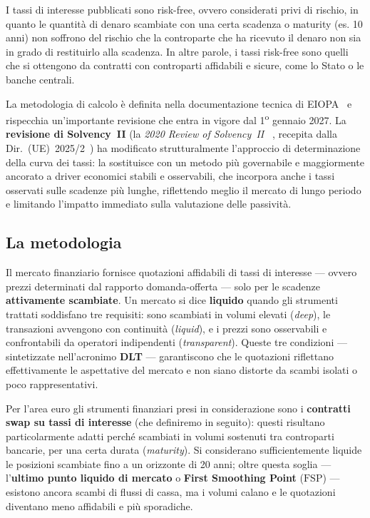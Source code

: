 \documentclass[11pt,a4paper]{article}
\theoremstyle{plain}
\theoremstyle{definition}
\theoremstyle{remark}
\newcommand{\FSP}{\mathrm{FSP}}
\begin{document}
I tassi di interesse pubblicati sono risk-free, ovvero considerati privi di rischio, in quanto le quantità di denaro scambiate con una certa scadenza o maturity (es. 10 anni)
non soffrono del rischio che la controparte che ha ricevuto il denaro non sia in grado di restituirlo alla scadenza. In altre parole, i tassi risk-free sono quelli che si ottengono da contratti con controparti affidabili e sicure, come lo Stato o le banche centrali.

La metodologia
di calcolo \`e definita nella documentazione tecnica di EIOPA~\cite{eiopa2026} e rispecchia
un'importante revisione che entra in vigore dal 1\textsuperscript{o} gennaio 2027. 
La \textbf{revisione di Solvency~II} (la \emph{2020 Review of Solvency~II}%
~\cite{eiopa2020opinion}, recepita dalla Dir.~(UE)~2025/2~\cite{dir2025}) 
ha modificato strutturalmente l'approccio di determinazione della curva dei tassi: la sostituisce con un metodo
più governabile e maggiormente ancorato a driver economici stabili e osservabili, che
incorpora anche i tassi osservati sulle scadenze pi\`u lunghe, riflettendo meglio il mercato di
lungo periodo e limitando l'impatto immediato sulla valutazione delle passivit\`a.

\subsection{La metodologia}

Il mercato finanziario fornisce quotazioni affidabili di tassi di interesse --- ovvero prezzi
determinati dal rapporto domanda-offerta --- solo per le scadenze
\textbf{attivamente scambiate}. Un mercato si dice \textbf{liquido} quando gli strumenti
trattati soddisfano tre requisiti: sono scambiati in volumi elevati (\emph{deep}), le
transazioni avvengono con continuità (\emph{liquid}),
e i prezzi sono osservabili e confrontabili da operatori indipendenti (\emph{transparent}).
Queste tre condizioni --- sintetizzate nell'acronimo \textbf{DLT} --- garantiscono che le
quotazioni riflettano effettivamente le aspettative del mercato e non siano distorte da
scambi isolati o poco rappresentativi.

Per l'area euro gli strumenti finanziari presi in considerazione sono i \textbf{contratti swap su
tassi di interesse} (che definiremo in seguito): questi risultano
particolarmente adatti perché scambiati in volumi sostenuti tra controparti bancarie, per una certa
durata (\emph{maturity}). Si considerano sufficientemente liquide le posizioni scambiate fino a un
orizzonte di 20 anni; oltre questa soglia --- l'\textbf{ultimo punto liquido di mercato} o
\textbf{First Smoothing Point} ($\FSP$) --- esistono ancora scambi di flussi di cassa, ma i volumi calano
e le quotazioni diventano meno affidabili e più sporadiche.
\end{document}
